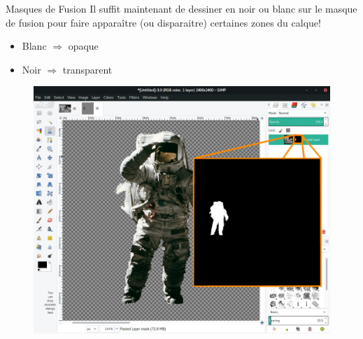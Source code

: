\documentclass[10pt,svgnames,usenames,table]{beamer}
\begin{document}
	\begin{frame}{Masques de Fusion}
		Il suffit maintenant de dessiner en noir ou blanc sur le masque de fusion pour faire apparaître (ou disparaitre) certaines zones du calque!
		\begin{itemize}
			\item Blanc $\Longrightarrow $ opaque
			\item Noir $ \Longrightarrow $ transparent
		\end{itemize}
		\begin{center}
			\begin{figure}
				\includegraphics[scale=.15]{Images/mask/mask3}	
			\end{figure}
		\end{center}
	\end{frame}
\end{document}

